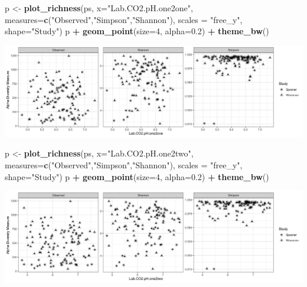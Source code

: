 \documentclass[]{article}
\newenvironment{Shaded}{\begin{snugshade}}{\end{snugshade}}
\newcommand{\DataTypeTok}[1]{\textcolor[rgb]{0.13,0.29,0.53}{#1}}
\newcommand{\DecValTok}[1]{\textcolor[rgb]{0.00,0.00,0.81}{#1}}
\newcommand{\FloatTok}[1]{\textcolor[rgb]{0.00,0.00,0.81}{#1}}
\newcommand{\KeywordTok}[1]{\textcolor[rgb]{0.13,0.29,0.53}{\textbf{#1}}}
\newcommand{\NormalTok}[1]{#1}
\newcommand{\OperatorTok}[1]{\textcolor[rgb]{0.81,0.36,0.00}{\textbf{#1}}}
\newcommand{\StringTok}[1]{\textcolor[rgb]{0.31,0.60,0.02}{#1}}
\begin{document}
\begin{Shaded}
\begin{Highlighting}[]
\NormalTok{p <-}\StringTok{ }\KeywordTok{plot_richness}\NormalTok{(ps, }\DataTypeTok{x=}\StringTok{"Lab.CO2.pH.one2one"}\NormalTok{, }\DataTypeTok{measures=}\KeywordTok{c}\NormalTok{(}\StringTok{"Observed"}\NormalTok{,}\StringTok{"Simpson"}\NormalTok{,}\StringTok{"Shannon"}\NormalTok{), }\DataTypeTok{scales =} \StringTok{"free_y"}\NormalTok{, }\DataTypeTok{shape=}\StringTok{"Study"}\NormalTok{)}
\NormalTok{p }\OperatorTok{+}\StringTok{ }\KeywordTok{geom_point}\NormalTok{(}\DataTypeTok{size=}\DecValTok{4}\NormalTok{, }\DataTypeTok{alpha=}\FloatTok{0.2}\NormalTok{) }\OperatorTok{+}\StringTok{ }\KeywordTok{theme_bw}\NormalTok{()}
\end{Highlighting}
\end{Shaded}

\includegraphics{output-rmd/richness-ph-Lab.CO2.pH.one2one-1.png}

\begin{Shaded}
\begin{Highlighting}[]
\NormalTok{p <-}\StringTok{ }\KeywordTok{plot_richness}\NormalTok{(ps, }\DataTypeTok{x=}\StringTok{"Lab.CO2.pH.one2two"}\NormalTok{, }\DataTypeTok{measures=}\KeywordTok{c}\NormalTok{(}\StringTok{"Observed"}\NormalTok{,}\StringTok{"Simpson"}\NormalTok{,}\StringTok{"Shannon"}\NormalTok{), }\DataTypeTok{scales =} \StringTok{"free_y"}\NormalTok{, }\DataTypeTok{shape=}\StringTok{"Study"}\NormalTok{)}
\NormalTok{p }\OperatorTok{+}\StringTok{ }\KeywordTok{geom_point}\NormalTok{(}\DataTypeTok{size=}\DecValTok{4}\NormalTok{, }\DataTypeTok{alpha=}\FloatTok{0.2}\NormalTok{) }\OperatorTok{+}\StringTok{ }\KeywordTok{theme_bw}\NormalTok{()}
\end{Highlighting}
\end{Shaded}

\includegraphics{output-rmd/richness-ph-Lab.CO2.pH.one2two-1.png}
\end{document}
